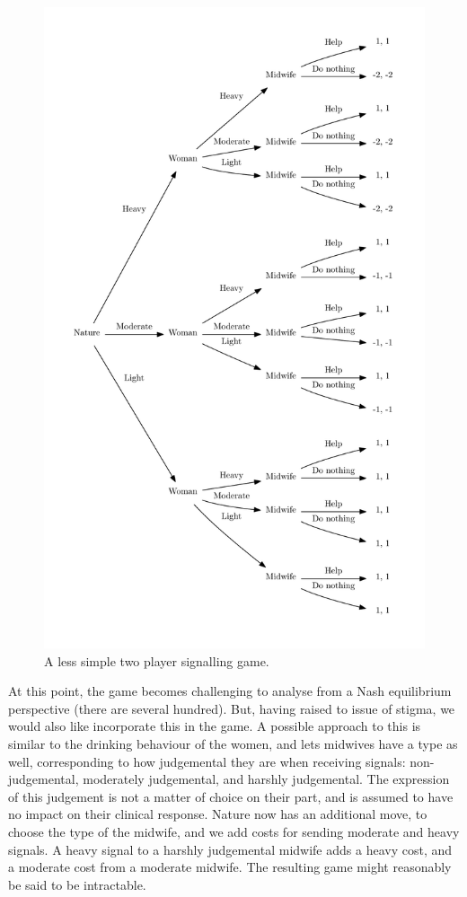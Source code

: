 \documentclass[graybox]{svmult}
\begin{document}
\begin{figure}[H]
\includegraphics[width=\textwidth]{figures/less_simplest_game}
\caption{A less simple two player signalling game. }

\label{fig:less_simple}
\end{figure}

At this point, the game becomes challenging to analyse from a Nash equilibrium perspective (there are several hundred). But, having raised to issue of stigma, we would also like incorporate this in the game. A possible approach to this is similar to the drinking behaviour of the women, and lets midwives have a type as well, corresponding to how judgemental they are when receiving signals: non-judgemental, moderately judgemental, and harshly judgemental. The expression of this judgement is not a matter of choice on their part, and is assumed to have no impact on their clinical response. Nature now has an additional move, to choose the type of the midwife, and we add costs for sending moderate and heavy signals. A heavy signal to a harshly judgemental midwife adds a heavy cost, and a moderate cost from a moderate midwife. The resulting game might reasonably be said to be intractable.
\end{document}
